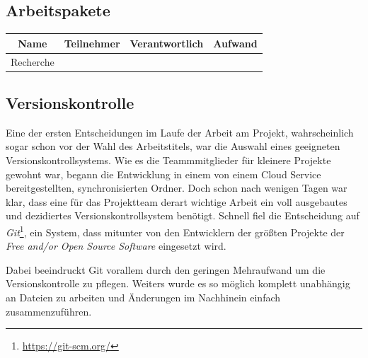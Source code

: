 \subsection{Arbeitspakete}
\label{sec:arbeitspakete}

\begin{tabular}{cccc}
	Name & Teilnehmer & Verantwortlich & Aufwand \\
	\hline\hline\hline
	Recherche & & & \\
	\hline\hline
\end{tabular}

\subsection{Versionskontrolle}
Eine der ersten Entscheidungen im Laufe der Arbeit am Projekt, wahrscheinlich sogar schon vor der Wahl des Arbeitstitels, war die Auswahl eines geeigneten Versionskontrollsystems. Wie es die Teammmitglieder für kleinere Projekte gewohnt war, begann die Entwicklung in einem von einem Cloud Service bereitgestellten, synchronisierten Ordner. Doch schon nach wenigen Tagen war klar, dass eine für das Projektteam derart wichtige Arbeit ein voll ausgebautes und dezidiertes Versionskontrollsystem benötigt. Schnell fiel die Entscheidung auf \textit{Git}\footnote{\url{https://git-scm.org/}}, ein System, dass mitunter von den Entwicklern der größten Projekte der \textit{Free and/or Open Source Software} eingesetzt wird.

Dabei beeindruckt Git vorallem durch den geringen Mehraufwand um die Versionskontrolle zu pflegen. Weiters wurde es so möglich komplett unabhängig an Dateien zu arbeiten und Änderungen im Nachhinein einfach zusammenzuführen.
